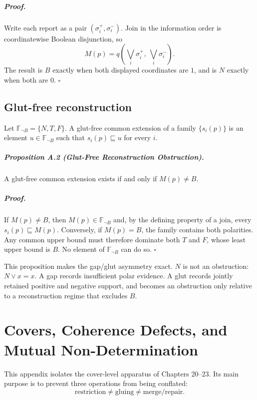 \paragraph{Proof.}
Write each report as a pair $(\sigma_i^+,\sigma_i^-)$. Join in the information order is coordinatewise Boolean disjunction, so
\[
M(p)=q\!\left(\bigvee_i\sigma_i^+,\ \bigvee_i\sigma_i^-\right).
\]
The result is $B$ exactly when both displayed coordinates are $1$, and is $N$ exactly when both are $0$. \hfill$\square$

\section*{Glut-free reconstruction}
Let $\mathbb F_{\neg B}=\{N,T,F\}$. A glut-free common extension of a family $\{s_i(p)\}$ is an element $u\in\mathbb F_{\neg B}$ such that $s_i(p)\sqsubseteq u$ for every $i$.

\paragraph{Proposition A.2 (Glut-Free Reconstruction Obstruction).}
A glut-free common extension exists if and only if $M(p)\neq B$.

\paragraph{Proof.}
If $M(p)\neq B$, then $M(p)\in\mathbb F_{\neg B}$ and, by the defining property of a join, every $s_i(p)\sqsubseteq M(p)$. Conversely, if $M(p)=B$, the family contains both polarities. Any common upper bound must therefore dominate both $T$ and $F$, whose least upper bound is $B$. No element of $\mathbb F_{\neg B}$ can do so. \hfill$\square$

This proposition makes the gap/glut asymmetry exact. $N$ is not an obstruction: $N\vee x=x$. A gap records insufficient polar evidence. A glut records jointly retained positive and negative support, and becomes an obstruction only relative to a reconstruction regime that excludes $B$.

\chapter{Covers, Coherence Defects, and Mutual Non-Determination}
\label{app:coherence-defects}

This appendix isolates the cover-level apparatus of Chapters 20--23. Its main purpose is to prevent three operations from being conflated:
\[
\text{restriction}\neq\text{gluing}\neq\text{merge/repair}.
\]

